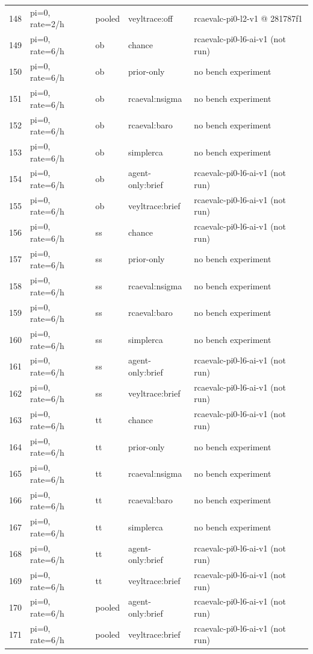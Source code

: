 \begin{longtable}{@{}r>{\raggedright\arraybackslash}p{48.0pt}>{\raggedright\arraybackslash}p{18.0pt}>{\raggedright\arraybackslash}p{108.0pt}>{\raggedright\arraybackslash}p{105.0pt}@{}}
148 & pi=0, rate=2/h & pooled & veyltrace:off & rcaevalc-pi0-l2-v1 @ 281787f1 \\
149 & pi=0, rate=6/h & ob & chance & rcaevalc-pi0-l6-ai-v1 (not run) \\
150 & pi=0, rate=6/h & ob & prior-only & no bench experiment \\
151 & pi=0, rate=6/h & ob & rcaeval:nsigma & no bench experiment \\
152 & pi=0, rate=6/h & ob & rcaeval:baro & no bench experiment \\
153 & pi=0, rate=6/h & ob & simplerca & no bench experiment \\
154 & pi=0, rate=6/h & ob & agent-only:brief & rcaevalc-pi0-l6-ai-v1 (not run) \\
155 & pi=0, rate=6/h & ob & veyltrace:brief & rcaevalc-pi0-l6-ai-v1 (not run) \\
156 & pi=0, rate=6/h & ss & chance & rcaevalc-pi0-l6-ai-v1 (not run) \\
157 & pi=0, rate=6/h & ss & prior-only & no bench experiment \\
158 & pi=0, rate=6/h & ss & rcaeval:nsigma & no bench experiment \\
159 & pi=0, rate=6/h & ss & rcaeval:baro & no bench experiment \\
160 & pi=0, rate=6/h & ss & simplerca & no bench experiment \\
161 & pi=0, rate=6/h & ss & agent-only:brief & rcaevalc-pi0-l6-ai-v1 (not run) \\
162 & pi=0, rate=6/h & ss & veyltrace:brief & rcaevalc-pi0-l6-ai-v1 (not run) \\
163 & pi=0, rate=6/h & tt & chance & rcaevalc-pi0-l6-ai-v1 (not run) \\
164 & pi=0, rate=6/h & tt & prior-only & no bench experiment \\
165 & pi=0, rate=6/h & tt & rcaeval:nsigma & no bench experiment \\
166 & pi=0, rate=6/h & tt & rcaeval:baro & no bench experiment \\
167 & pi=0, rate=6/h & tt & simplerca & no bench experiment \\
168 & pi=0, rate=6/h & tt & agent-only:brief & rcaevalc-pi0-l6-ai-v1 (not run) \\
169 & pi=0, rate=6/h & tt & veyltrace:brief & rcaevalc-pi0-l6-ai-v1 (not run) \\
170 & pi=0, rate=6/h & pooled & agent-only:brief & rcaevalc-pi0-l6-ai-v1 (not run) \\
171 & pi=0, rate=6/h & pooled & veyltrace:brief & rcaevalc-pi0-l6-ai-v1 (not run) \\

\end{longtable}
